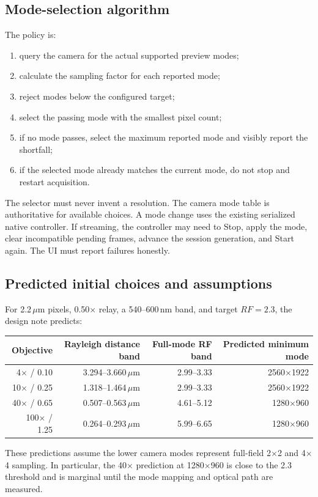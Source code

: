\documentclass[11pt,a4paper,oneside]{article}
\begin{document}
\subsection{Mode-selection algorithm}
The policy is:
\begin{enumerate}
  \item query the camera for the actual supported preview modes;
  \item calculate the sampling factor for each reported mode;
  \item reject modes below the configured target;
  \item select the passing mode with the smallest pixel count;
  \item if no mode passes, select the maximum reported mode and visibly report the shortfall;
  \item if the selected mode already matches the current mode, do not stop and restart acquisition.
\end{enumerate}

The selector must never invent a resolution. The camera mode table is authoritative for available choices. A mode change uses the existing serialized native controller. If streaming, the controller may need to Stop, apply the mode, clear incompatible pending frames, advance the session generation, and Start again. The UI must report failures honestly.

\subsection{Predicted initial choices and assumptions}
For 2.2\,$\mu$m pixels, 0.50$\times$ relay, a 540--600\,nm band, and target $RF=2.3$, the design note predicts:
\begin{center}
\begin{tabular}{rrrr}
\toprule
Objective & Rayleigh distance band & Full-mode RF band & Predicted minimum mode\\
\midrule
4$\times$ / 0.10 & 3.294--3.660\,$\mu$m & 2.99--3.33 & 2560$\times$1922\\
10$\times$ / 0.25 & 1.318--1.464\,$\mu$m & 2.99--3.33 & 2560$\times$1922\\
40$\times$ / 0.65 & 0.507--0.563\,$\mu$m & 4.61--5.12 & 1280$\times$960\\
100$\times$ / 1.25 & 0.264--0.293\,$\mu$m & 5.99--6.65 & 1280$\times$960\\
\bottomrule
\end{tabular}
\end{center}
These predictions assume the lower camera modes represent full-field 2$\times$2 and 4$\times$4 sampling. In particular, the 40$\times$ prediction at 1280$\times$960 is close to the 2.3 threshold and is marginal until the mode mapping and optical path are measured.
\end{document}
